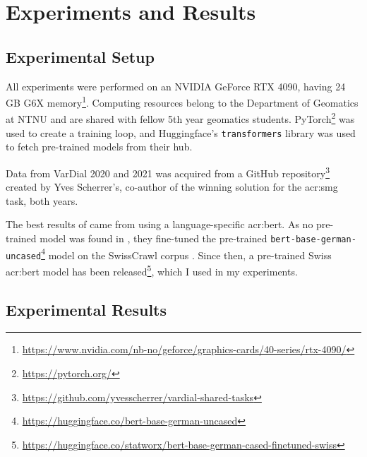 \section{Experiments and Results}
\label{sec:Experiments}

\begin{comment}
Trying and failing is a major part of research.
However, to have a chance of success you need a plan driving the experimental research.
So first decide what experiments or series of experiments you plan --- and describe them in this section.
\end{comment}

\subsection{Experimental Setup}
\label{sec:experimentalSetup}


All experiments were performed on an NVIDIA GeForce RTX 4090, having 24 GB G6X memory\footnote{\url{https://www.nvidia.com/nb-no/geforce/graphics-cards/40-series/rtx-4090/}}. Computing resources belong to the Department of Geomatics at NTNU and are shared with fellow 5th year geomatics students. PyTorch\footnote{\url{https://pytorch.org/}} was used to create a training loop, and Huggingface's \texttt{transformers} library was used to fetch pre-trained models from their hub.

Data from VarDial 2020 and 2021 was acquired from a GitHub repository\footnote{\url{https://github.com/yvesscherrer/vardial-shared-tasks}} created by Yves Scherrer's, co-author of the winning solution for the \gls{acr:smg} task, both years.

The best results of \cite{scherrerHeLjuVarDial20202020} came from using a language-specific \acrshort{acr:bert}. As no pre-trained model was found in \citeyear{scherrerHeLjuVarDial20202020}, they fine-tuned the pre-trained \texttt{bert-base-german-uncased}\footnote{\url{https://huggingface.co/bert-base-german-uncased}} model on the SwissCrawl corpus \citep[3-4]{scherrerHeLjuVarDial20202020}. Since then, a pre-trained Swiss \acrshort{acr:bert} model has been released\footnote{\url{https://huggingface.co/statworx/bert-base-german-cased-finetuned-swiss}}, which I used in my experiments.

\subsection{Experimental Results}
\label{sec:experimentalResults}

